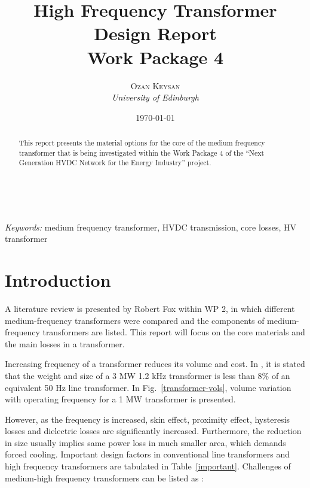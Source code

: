 \documentclass[a4paper, 11pt]{article} %
\title{\textbf{High Frequency Transformer Design Report}\\ %
Work Package 4} %
\author{\textsc{Ozan Keysan} %
\\{\textit{University of Edinburgh}}} %
\date{\today} %
\makeatletter
\renewcommand{\maketitle}{ %
\begin{flushright} %
{\LARGE\@title} %

\vspace{50pt} %

{\large\@author} %
\\\@date %

\vspace{40pt} %
\end{flushright}
}
\makeatother
\begin{document}
\maketitle %



\begin{abstract}
This report presents the material options for the core of the medium frequency transformer that is being investigated within the Work Package 4 of the ``Next Generation HVDC Network for the   Energy Industry'' project. 
\end{abstract}

\hspace*{3,6mm}\textit{Keywords:} medium frequency transformer, HVDC transmission, core losses, HV transformer %

\vspace{30pt} %


\section{Introduction}


A literature review is presented by Robert Fox within WP 2, in which different medium-frequency transformers were compared and the components of medium-frequency transformers are listed. This report will focus on the core materials and the main losses in a transformer.

Increasing frequency of a transformer reduces its volume and cost. In \cite{Prasai2007}, it is stated that the weight and size of a 3 MW 1.2 kHz transformer is less than 8\% of an equivalent 50 Hz line transformer. In Fig.~\ref{transformer-vols}, volume variation with operating frequency for a 1 MW transformer is presented.

However, as the frequency is increased, skin effect, proximity effect, hysteresis losses and dielectric losses are significantly increased. Furthermore, the reduction in size usually implies same power loss in much smaller area, which demands forced cooling.
Important design factors in conventional line transformers and high frequency transformers are tabulated in Table~\ref{important}.
Challenges of medium-high frequency transformers can be listed as 
 \cite{Villar2010}:
\end{document}
